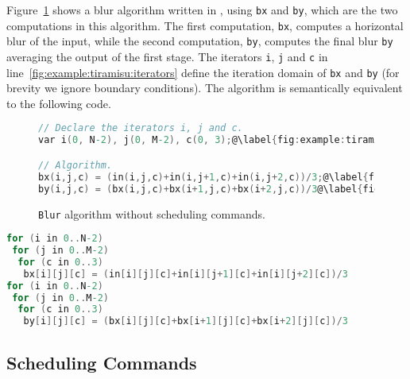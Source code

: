 Figure~\ref{fig:algorithm} shows a blur algorithm written in \framework, using \texttt{bx} and \texttt{by}, which are the two computations in this algorithm.
The first computation, \texttt{bx}, computes a horizontal blur of the input, while the second computation, \texttt{by}, computes the final blur \texttt{by} averaging the output of the first stage.
The iterators \texttt{i}, \texttt{j} and \texttt{c} in line~\ref{fig:example:tiramisu:iterators} define the iteration domain of \texttt{bx} and \texttt{by} (for brevity we ignore boundary conditions).
The algorithm is semantically equivalent to the following code.

\begin{figure}
\begin{lstlisting}[language=C,escapechar=@]
// Declare the iterators i, j and c.
var i(0, N-2), j(0, M-2), c(0, 3);@\label{fig:example:tiramisu:iterators}@

// Algorithm.
bx(i,j,c) = (in(i,j,c)+in(i,j+1,c)+in(i,j+2,c))/3;@\label{fig:example:tiramisu:computation1}@
by(i,j,c) = (bx(i,j,c)+bx(i+1,j,c)+bx(i+2,j,c))/3@\label{fig:example:tiramisu:computation2}@);
\end{lstlisting}
\vspace{-0.25cm}
\caption{\label{fig:algorithm}\texttt{Blur} algorithm without scheduling commands.}
\vspace{-0.25cm}
\end{figure}

\begin{lstlisting}[language=C,escapechar=@]
for (i in 0..N-2)
 for (j in 0..M-2)
  for (c in 0..3)
   bx[i][j][c] = (in[i][j][c]+in[i][j+1][c]+in[i][j+2][c])/3
for (i in 0..N-2)
 for (j in 0..M-2)
  for (c in 0..3)
   by[i][j][c] = (bx[i][j][c]+bx[i+1][j][c]+bx[i+2][j][c])/3
\end{lstlisting}


\vspace{-0.25cm}
\subsection{Scheduling Commands}

